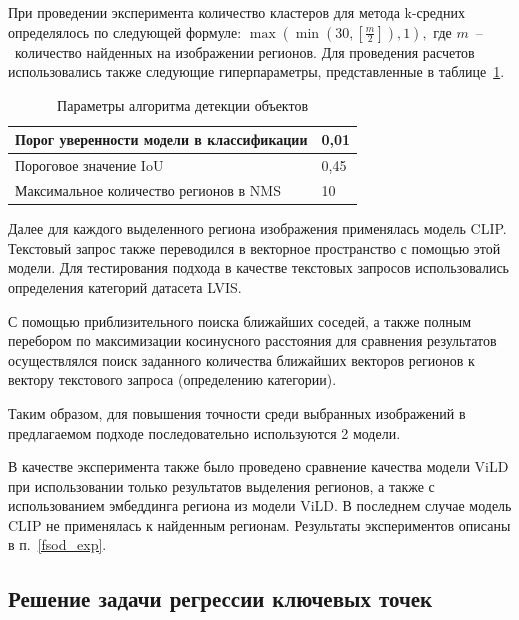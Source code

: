\documentclass[a4paper,14pt]{article}
\begin{document}
    При проведении эксперимента количество кластеров для метода k-средних определялось по следующей формуле:
    $\max(\min(30, \left[\frac{m}{2}\right]), 1),$ где $m$~--~количество найденных на изображении регионов.
    Для проведения расчетов использовались также следующие гиперпараметры, представленные в таблице~\ref{tab:base_params}.

    \begin{center}
        \begin{table}[H]
            \centering
            \caption{Параметры алгоритма детекции объектов}
            \label{tab:base_params}
            \bgroup
            \def\arraystretch{1.5}
            \begin{tabular}{| l | l |}
                \hline
                Порог уверенности модели в классификации & 0,01 \\ \hline
                Пороговое значение IoU                   & 0,45 \\ \hline
                Максимальное количество регионов в NMS   & 10   \\
                \hline
            \end{tabular}
            \egroup
        \end{table}
    \end{center}

    Далее для каждого выделенного региона изображения применялась модель CLIP.
    Текстовый запрос также переводился в векторное пространство с помощью этой модели.
    Для тестирования подхода в качестве текстовых запросов использовались определения категорий датасета LVIS.

    С помощью приблизительного поиска ближайших соседей, а также полным перебором по максимизации косинусного расстояния для сравнения результатов осуществлялся поиск заданного количества ближайших векторов регионов к вектору текстового запроса (определению категории).

    Таким образом, для повышения точности среди выбранных изображений в предлагаемом подходе последовательно используются 2 модели.

    В качестве эксперимента также было проведено сравнение качества модели ViLD при использовании только результатов выделения регионов, а также с использованием эмбеддинга региона из модели ViLD.
    В последнем случае модель CLIP не применялась к найденным регионам.
    Результаты экспериментов описаны в п.~\ref{fsod_exp}.

    \subsection{Решение задачи регрессии ключевых точек}
\end{document}
